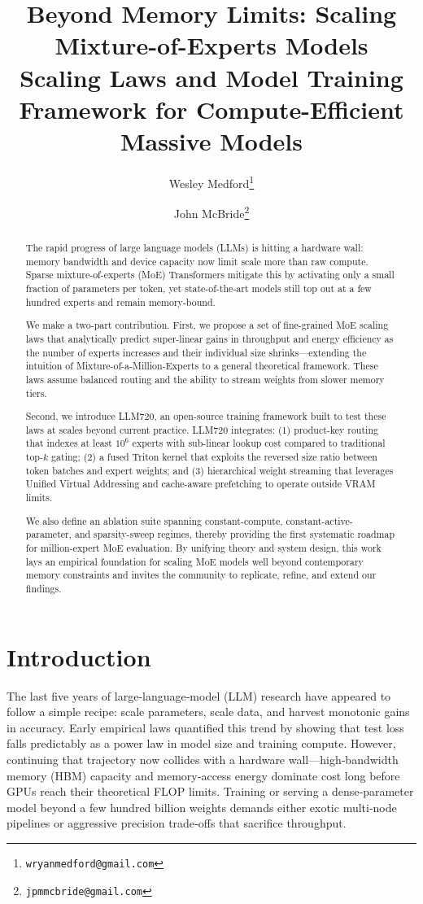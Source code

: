 \documentclass[12pt]{article}
\title{Beyond Memory Limits: Scaling Mixture-of-Experts Models\\[1ex]
\large Scaling Laws and Model Training Framework for Compute-Efficient Massive Models}
\author{
  Wesley Medford\thanks{\texttt{wryanmedford@gmail.com}} \and
  John McBride\thanks{\texttt{jpmmcbride@gmail.com}}
}
\date{}
\begin{document}
\maketitle

\begin{abstract}
The rapid progress of large language models (LLMs) is hitting a hardware wall: memory bandwidth and device capacity now limit scale more than raw compute. Sparse mixture-of-experts (MoE) Transformers mitigate this by activating only a small fraction of parameters per token, yet state-of-the-art models still top out at a few hundred experts and remain memory-bound.

We make a two-part contribution. First, we propose a set of fine-grained MoE scaling laws that analytically predict super-linear gains in throughput and energy efficiency as the number of experts increases and their individual size shrinks---extending the intuition of Mixture-of-a-Million-Experts \cite{MillionExperts2024} to a general theoretical framework. These laws assume balanced routing and the ability to stream weights from slower memory tiers.

Second, we introduce LLM720, an open-source training framework built to test these laws at scales beyond current practice. LLM720 integrates: (1) product-key routing that indexes at least $10^6$ experts with sub-linear lookup cost compared to traditional top-$k$ gating; (2) a fused Triton kernel that exploits the reversed size ratio between token batches and expert weights; and (3) hierarchical weight streaming that leverages Unified Virtual Addressing and cache-aware prefetching to operate outside VRAM limits.

We also define an ablation suite spanning constant-compute, constant-active-parameter, and sparsity-sweep regimes, thereby providing the first systematic roadmap for million-expert MoE evaluation. By unifying theory and system design, this work lays an empirical foundation for scaling MoE models well beyond contemporary memory constraints and invites the community to replicate, refine, and extend our findings.
\end{abstract}

\section{Introduction}
The last five years of large‑language‑model (LLM) research have appeared to follow a simple recipe: scale parameters, scale data, and harvest monotonic gains in accuracy. Early empirical laws quantified this trend by showing that test loss falls predictably as a power law in model size and training compute. However, continuing that trajectory now collides with a hardware wall—high‑bandwidth memory (HBM) capacity and memory‑access energy dominate cost long before GPUs reach their theoretical FLOP limits. Training or serving a dense‑parameter model beyond a few hundred billion weights demands either exotic multi‑node pipelines or aggressive precision trade‑offs that sacrifice throughput.
\end{document}
